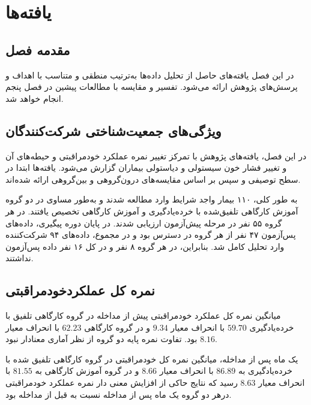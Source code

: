 \ChapterStart
\chapter{یافته‌ها}
\label{ch:results}

\section{مقدمه فصل}
\label{sec:ch4-intro}
در این فصل یافته‌های حاصل از تحلیل داده‌ها به‌ترتیب منطقی و متناسب با اهداف
و پرسش‌های پژوهش ارائه می‌شود. تفسیر و مقایسه با مطالعات پیشین در فصل پنجم
انجام خواهد شد.

\section{ویژگی‌های جمعیت‌شناختی شرکت‌کنندگان}
\label{sec:demographics}
در این فصل، یافته‌های پژوهش با تمرکز تغییر نمره عملکرد خودمراقبتی و حیطه‌های آن و تغییر فشار خون سیستولی و دیاستولی بیماران گزارش می‌شود. یافته‌ها ابتدا در سطح توصیفی و سپس بر اساس مقایسه‌های درون‌گروهی و بین‌گروهی ارائه شده‌اند.
\par
به طور کلی، ۱۱۰ بیمار واجد شرایط وارد مطالعه شدند و به‌طور مساوی در دو گروه آموزش کارگاهی تلفیق‌شده با خرده‌یادگیری و آموزش کارگاهی تخصیص یافتند. در هر گروه ۵۵ نفر در مرحله پیش‌آزمون ارزیابی شدند. در پایان دوره پیگیری، داده‌های پس‌آزمون ۴۷ نفر از هر گروه در دسترس بود و در مجموع، داده‌های ۹۴ شرکت‌کننده وارد تحلیل کامل شد. بنابراین، در هر گروه ۸ نفر و در کل ۱۶ نفر داده پس‌آزمون نداشتند.




\section{نمره کل عملکردخودمراقبتی}
میانگین نمره کل عملکرد خودمراقبتی پیش از مداخله در گروه کارگاهی تلفیق با خرده‌یادگیری $59.70$ با انحراف معیار $9.34$ و در گروه کارگاهی $62.23$ با انحراف معیار $8.16$ بود. تفاوت نمره پایه دو گروه از نظر آماری معنادار نبود.
\par
یک ماه پس از مداخله، میانگین نمره کل خودمراقبتی در گروه کارگاهی تلفیق شده با خرده‌یادگیری به $86.89$ با انحراف معیار $8.66$ و در گروه آموزش کارگاهی به $81.55$ با انحراف معیار $8.63$ رسید که نتایج حاکی از  افزایش معنی دار  نمره عملکرد خودمراقبتی درهر دو گروه یک ماه پس از مداخله نسبت به قبل از مداخله بود.

